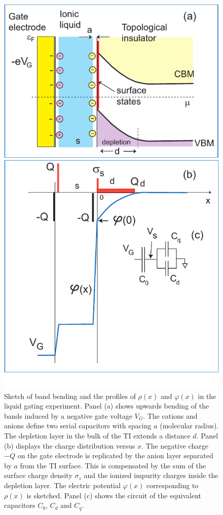 \begin{figure}[!htbp]
  \begin{center}
\includegraphics[width=0.65\linewidth]{ch-liquid/figures/FigGate.pdf}
\caption{\label{figGate} 
Sketch of band bending and the profiles of $\rho(x)$ and $\varphi(x)$ in the liquid gating experiment.
Panel (a) shows upwards bending of the bands induced by a negative gate voltage $V_G$. The cations and anions 
define two serial capacitors with spacing $a$ (molecular radius). The depletion layer in the bulk of the TI extends
a distance $d$. Panel (b) displays the charge distribution versus $x$. The negative charge $-Q$ on the gate electrode is
replicated by the anion layer separated by $a$ from the TI surface. This is compensated by the sum of the surface charge density
$\sigma_s$ and the ionized impurity charges inside the depletion layer. The electric potential $\varphi(x)$ corresponding to
$\rho(x)$ is sketched. Panel (c) shows the circuit of the equivalent capacitors $C_0$, $C_d$ and $C_q$.
}
  \end{center}
\end{figure} 



